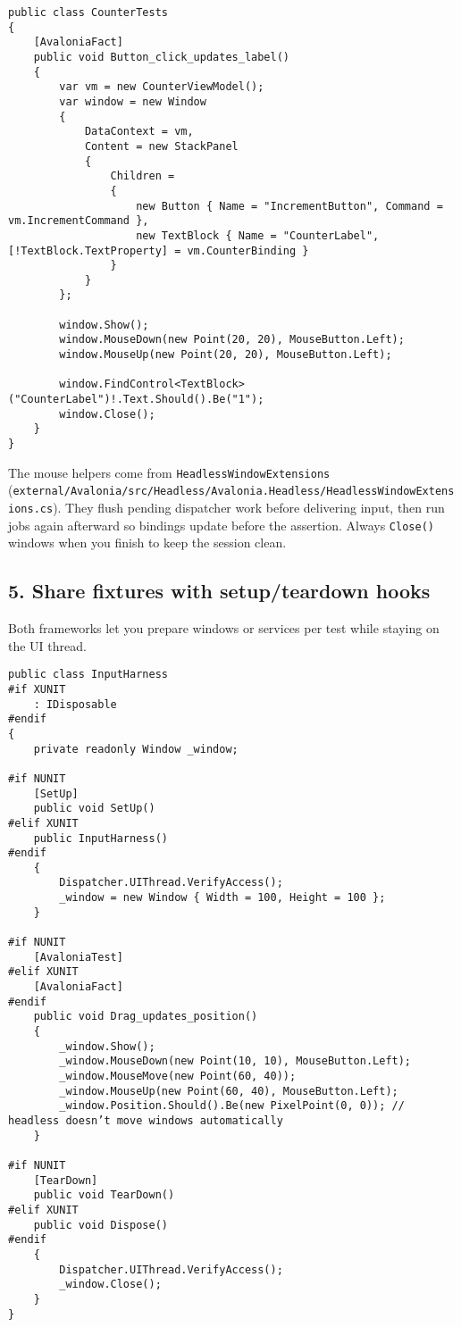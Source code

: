 \begin{lstlisting}
public class CounterTests
{
    [AvaloniaFact]
    public void Button_click_updates_label()
    {
        var vm = new CounterViewModel();
        var window = new Window
        {
            DataContext = vm,
            Content = new StackPanel
            {
                Children =
                {
                    new Button { Name = "IncrementButton", Command = vm.IncrementCommand },
                    new TextBlock { Name = "CounterLabel", [!TextBlock.TextProperty] = vm.CounterBinding }
                }
            }
        };

        window.Show();
        window.MouseDown(new Point(20, 20), MouseButton.Left);
        window.MouseUp(new Point(20, 20), MouseButton.Left);

        window.FindControl<TextBlock>("CounterLabel")!.Text.Should().Be("1");
        window.Close();
    }
}
\end{lstlisting}

The mouse helpers come from
\passthrough{\lstinline!HeadlessWindowExtensions!}
(\passthrough{\lstinline!external/Avalonia/src/Headless/Avalonia.Headless/HeadlessWindowExtensions.cs!}).
They flush pending dispatcher work before delivering input, then run
jobs again afterward so bindings update before the assertion. Always
\passthrough{\lstinline!Close()!} windows when you finish to keep the
session clean.

\subsection{5. Share fixtures with setup/teardown
hooks}\label{share-fixtures-with-setupteardown-hooks}

Both frameworks let you prepare windows or services per test while
staying on the UI thread.

\begin{lstlisting}
public class InputHarness
#if XUNIT
    : IDisposable
#endif
{
    private readonly Window _window;

#if NUNIT
    [SetUp]
    public void SetUp()
#elif XUNIT
    public InputHarness()
#endif
    {
        Dispatcher.UIThread.VerifyAccess();
        _window = new Window { Width = 100, Height = 100 };
    }

#if NUNIT
    [AvaloniaTest]
#elif XUNIT
    [AvaloniaFact]
#endif
    public void Drag_updates_position()
    {
        _window.Show();
        _window.MouseDown(new Point(10, 10), MouseButton.Left);
        _window.MouseMove(new Point(60, 40));
        _window.MouseUp(new Point(60, 40), MouseButton.Left);
        _window.Position.Should().Be(new PixelPoint(0, 0)); // headless doesn’t move windows automatically
    }

#if NUNIT
    [TearDown]
    public void TearDown()
#elif XUNIT
    public void Dispose()
#endif
    {
        Dispatcher.UIThread.VerifyAccess();
        _window.Close();
    }
}
\end{lstlisting}

